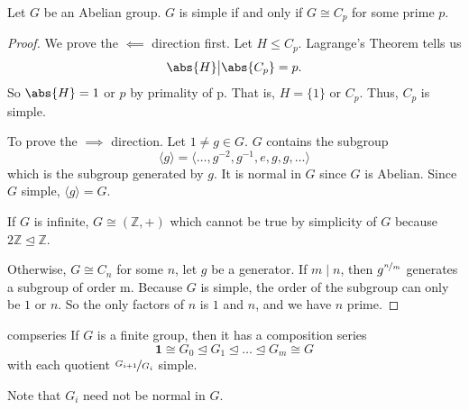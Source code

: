 \begin{lemma}{}{}
    Let \(G\) be an Abelian group. \(G\) is simple if and only if \(G \cong C_p\) for some prime \(p\).
\end{lemma}
\begin{proof}
    We prove the \(\impliedby \) direction first. Let \(H \leq C_p\). Lagrange's Theorem tells us
    \[
        \abs{H} \big\vert \abs{C_p} = p.
    \]
    So \(\abs{H} = 1\) or \(p\) by primality of p. That is, \(H = \{1\}\) or \(C_p\). Thus, \(C_p\) is simple.

    To prove the \(\implies\) direction. Let \(1 \neq g \in G\). \(G\) contains the subgroup
    \[
        \langle g\rangle = \langle\ldots ,g^{-2},g^{-1},e,g,g, \ldots\rangle 
    \]
    which is the subgroup generated by \(g\). It is normal in \(G\) since \(G\) is Abelian. Since \(G\) simple, \(\langle g\rangle = G\).

    If \(G\) is infinite, \(G \cong (\mathbb{Z}, +)\) which cannot be true by simplicity of \(G\) because \(2\mathbb{Z}\trianglelefteq \mathbb{Z}\).

    Otherwise, \(G \cong C_n\) for some \(n\), let \(g\) be a generator. If \(m\mid n\), then \(g^{\nicefrac{n}{m}}\) generates a subgroup of order m. Because \(G\) is simple, the order of the subgroup can only be \(1\) or \(n\). So the only factors of \(n\) is \(1\) and \(n\), and we have \(n\) prime.
\end{proof}
\begin{lemma}{}{compseries}
    If \(G\) is a finite group, then it has a composition series
    \[
        \textbf{1} \cong G_0 \trianglelefteq G_1 \trianglelefteq \ldots \trianglelefteq G_m \cong G
    \]
    with each quotient \(\nicefrac{G_{i+1}}{G_{i}}\) simple.

    Note that \(G_i\) need not be normal in \(G\).
\end{lemma}